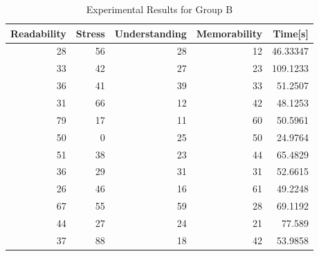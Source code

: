 \documentclass[authoryear]{elsarticle}
\begin{document}
\begin{table}[htbp]
  \centering
  \caption{Experimental Results for Group B}
  \label{tab:data_b}
  \begin{tabular}{rrrrr}
    \toprule
    Readability & Stress & Understanding & Memorability & Time[s]  \\
    \midrule
    28          & 56     & 28            & 12           & 46.33347 \\
    33          & 42     & 27            & 23           & 109.1233 \\
    36          & 41     & 39            & 33           & 51.2507  \\
    31          & 66     & 12            & 42           & 48.1253  \\
    79          & 17     & 11            & 60           & 50.5961  \\
    50          & 0      & 25            & 50           & 24.9764  \\
    51          & 38     & 23            & 44           & 65.4829  \\
    36          & 29     & 31            & 31           & 52.6615  \\
    26          & 46     & 16            & 61           & 49.2248  \\
    67          & 55     & 59            & 28           & 69.1192  \\
    44          & 27     & 24            & 21           & 77.589   \\
    37          & 88     & 18            & 42           & 53.9858  \\
    \bottomrule
  \end{tabular}
\end{table}

\begin{table}[htbp]
  \centering
  \caption{Summary Statistics for Group A}
  \label{tab:statistics_a}
\end{table}
\end{document}
